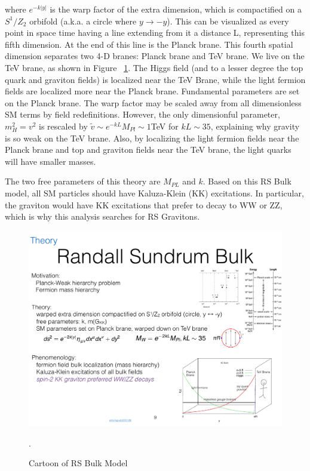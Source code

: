 where $e^{-k|y|}$ is the warp factor of the extra dimension, which is compactified on a $S^{1}/Z_{2}$ orbifold (a.k.a. a circle where $y \rightarrow -y$). This can be visualized as every point in space time having a line extending from it a distance L, representing this fifth dimension. At the end of this line is the Planck brane. This fourth spatial dimension separates two 4-D branes: Planck brane and TeV brane. We live on the TeV brane, as shown in Figure ~\ref{fig:RS_cartoon}. The Higgs field (and to a lesser degree the top quark and graviton fields) is localized near the TeV Brane, while the light fermion fields are localized more near the Planck brane. Fundamental parameters are set on the Planck brane. The warp factor may be scaled away from all dimensionless SM terms by field redefinitions. However, the only dimensionful parameter, $m_{H}^{2}=v^{2}$ is rescaled by $\tilde{v}\sim e^{-kL}M_{Pl}\sim 1$TeV for $kL\sim 35$, explaining why gravity is so weak on the TeV brane. Also, by localizing the light fermion fields near the Planck brane and top and graviton fields near the TeV brane, the light quarks will have smaller masses. 

The two free parameters of this theory are $M_{PL}$ and $k$. Based on this RS Bulk model, all SM particles should have Kaluza-Klein (KK) excitations. In particular, the graviton would have KK excitations that prefer to decay to WW or ZZ, which is why this analysis searches for RS Gravitons. 


\begin{figure}[h!]
  \centering
  \includegraphics[width=\hsize]{figures/Theory/RS_cartoon.pdf}
  \caption{Cartoon of RS Bulk Model}. 
  \label{fig:RS_cartoon}
\end{figure}
\FloatBarrier


